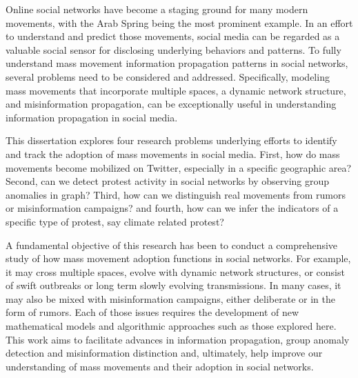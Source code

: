\documentclass[12pt,dvips]{report}
\begin{document}
Online social networks have become a staging ground for many modern movements, with the Arab Spring being the most prominent example. In an effort to understand and predict those movements, social media can be regarded as a valuable social sensor for disclosing underlying behaviors and patterns. To fully understand mass movement information propagation patterns in social networks, several problems need to be considered and addressed. Specifically, modeling mass movements that incorporate multiple spaces, a dynamic network structure, and misinformation
propagation, can be exceptionally useful in understanding information propagation in social media.

This dissertation explores four research problems underlying efforts to identify and track the adoption of mass movements in social media. First, how do mass movements become mobilized on Twitter, especially in a specific geographic area? Second, can we detect protest activity in social networks by observing group anomalies in graph? Third, how can we distinguish real movements from rumors or misinformation campaigns? and fourth, how can we infer the indicators of a specific type of protest, say climate related protest?

A fundamental objective of this research has been to conduct a comprehensive study of how mass movement adoption functions in social networks. For example, it may cross multiple spaces, evolve with dynamic network structures, or consist of swift outbreaks or long term slowly evolving transmissions. In many cases, it may also be mixed with misinformation campaigns, either deliberate or in the form of rumors. Each of those issues requires the development of new mathematical models and algorithmic approaches such as those explored here.  This work aims to facilitate advances in information propagation, group anomaly detection and misinformation distinction and, ultimately, help improve our understanding of mass movements and their adoption in social networks.


\end{document}
